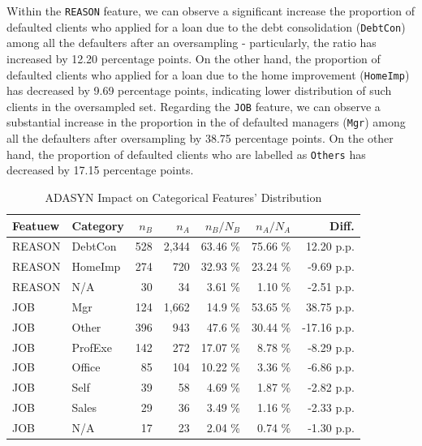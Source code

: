 Within the \texttt{REASON} feature, we can observe a significant increase the proportion of defaulted clients who applied for a loan due to the debt consolidation (\texttt{DebtCon}) among all the defaulters after an oversampling - particularly, the ratio has increased by 12.20 percentage points.
On the other hand, the proportion of defaulted clients who applied for a loan due to the home improvement (\texttt{HomeImp}) has decreased by 9.69 percentage points, indicating lower distribution of such clients in the oversampled set.
Regarding the \texttt{JOB} feature, we can observe a substantial increase in the proportion in the of defaulted managers (\texttt{Mgr}) among all the defaulters after oversampling by 38.75 percentage points.
On the other hand, the proportion of defaulted clients who are labelled as \texttt{Others} has decreased by 17.15 percentage points.

\begin{table}[H]
    \small
    \setlength{\tabcolsep}{8pt}
    \renewcommand{\arraystretch}{1.3}
    \centering
    \caption[ADASYN Impact on Categorical Features' Distribution]{ADASYN Impact on Categorical Features' Distribution}\label{tab:adasynimpact}
    \begin{tabular}{|ll|rr|rr|r|}
    
        \hline
    Featuew & Category & $n_{B}$ & $n_{A}$ & $n_{B} / N_{B}$ &$n_{A} / N_{A}$ & Diff. \\ 
    \midrule
    \midrule
    REASON & DebtCon & 528 & 2,344 & 63.46 \% & 75.66 \% & 12.20 p.p. \\ 
    REASON & HomeImp & 274 & 720 & 32.93 \% & 23.24 \% & -9.69 p.p. \\
    REASON & N/A & 30 & 34 & 3.61 \% & 1.10 \% & -2.51 p.p. \\
    \hline
    JOB & Mgr & 124 & 1,662 & 14.9 \% & 53.65 \% & 38.75 p.p. \\ 
    JOB & Other & 396 & 943 & 47.6 \% & 30.44 \% & -17.16 p.p. \\ 
    JOB & ProfExe & 142 & 272 & 17.07 \% & 8.78 \% & -8.29 p.p. \\ 
    JOB & Office & 85 & 104 & 10.22 \% & 3.36 \% & -6.86 p.p. \\ 
    JOB & Self & 39 & 58 & 4.69 \% & 1.87 \% & -2.82 p.p. \\
    JOB & Sales & 29 & 36 & 3.49 \% & 1.16 \% & -2.33 p.p. \\ 
    JOB & N/A & 17 & 23 & 2.04 \% & 0.74 \% & -1.30 p.p. \\ 
    \hline
    \bottomrule
    \end{tabular}
    \vspace{0.7em}
    
    \vspace{-1em}
\end{table}

